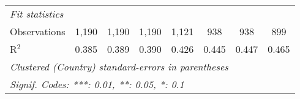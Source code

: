 \begin{tabular}{lccccccc}
   \midrule \emph{Fit statistics}\\
   Observations                                                     & 1,190       & 1,190       & 1,190        & 1,121          & 938            & 938            & 899\\  
   R$^2$                                                            & 0.385       & 0.389       & 0.390        & 0.426          & 0.445          & 0.447          & 0.465\\  
   \midrule
   \multicolumn{8}{l}{\emph{Clustered (Country) standard-errors in parentheses}}\\
   \multicolumn{8}{l}{\emph{Signif. Codes: ***: 0.01, **: 0.05, *: 0.1}}\\
\end{tabular}
\par\endgroup


